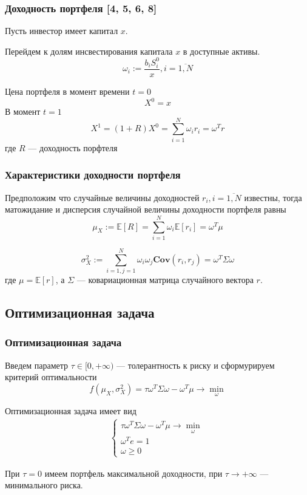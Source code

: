 \documentclass{beamer}
\newcommand{\E}[1]{\mathbb{E}\left[#1\right]} %
\newcommand{\COV}[2]{\textbf{Cov}\left(#1, #2\right)}
\begin{document}
\begin{frame}
    \frametitle{Доходность портфеля [4, 5, 6, 8]}
    Пусть инвестор имеет капитал $x$.

    Перейдем к долям инсвестирования капитала $x$ в доступные активы.
    \[
        \omega_i := \frac{b_i S_i^0}{x}, i=\overline{1, N}
    \]

    Цена портфеля в момент времени $t=0$
    \[
        X^0 = x
    \]
    В момент $t=1$
    \[
        X^1 = (1+R)X^0 = \sum_{i=1}^{N} \omega_i r_i = \omega^T r
    \]
    где $R$ --- доходность порфтеля
\end{frame}

\begin{frame}
    \frametitle{Характеристики доходности портфеля}

    Предположим что случайные величины доходностей $r_i, i=\overline{1, N}$ известны, тогда
    матожидание и дисперсия случайной величины доходности портфеля равны
    \[
        \mu_X := \E{R} = \sum_{i=1}^{N} \omega_i \E{r_i} = \omega^T \mu
    \]

    \[
        \sigma_X^2 := \sum_{i=1, j=1}^{N} \omega_i \omega_j \COV{r_i}{r_j} =
        \omega^T \Sigma \omega
    \]
    где $\mu = \E{r}$, а $\Sigma$ --- ковариационная матрица случайного вектора $r$.
\end{frame}

\subsection{Оптимизационная задача}

\begin{frame}
    \frametitle{Оптимизационная задача}
    Введем параметр $\tau \in [0, +\infty)$ --- толерантность к риску и сформурируем критерий оптимальности
    \[ 
        f(\mu_X, \sigma_X^2) = \tau \omega^T \Sigma \omega - \omega^T \mu \rightarrow \min_{\omega}
    \]

    Оптимизационная задача имеет вид
    \begin{align*}
        \begin{cases}
            \tau \omega^T \Sigma \omega - \omega^T \mu \rightarrow \min_{\omega} \\
            \omega^T e = 1 \\
            \omega \ge 0
        \end{cases}
    \end{align*}

    При $\tau=0$ имеем портфель максимальной доходности, при $\tau \rightarrow +\infty$
    --- минимального риска.
\end{frame}
\end{document}
